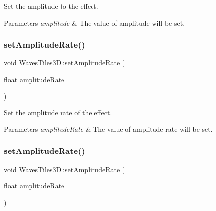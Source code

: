 Set the amplitude to the effect. 


\begin{DoxyParams}{Parameters}
{\em amplitude} & The value of amplitude will be set. \\
\hline
\end{DoxyParams}
\mbox{\label{classWavesTiles3D_a5c31881ea4cee059ce9ea49f1c8acb76}} 
\subsubsection{\texorpdfstring{set\+Amplitude\+Rate()}{setAmplitudeRate()}\hspace{0.1cm}{\footnotesize\ttfamily [1/2]}}
{\footnotesize\ttfamily void Waves\+Tiles3\+D\+::set\+Amplitude\+Rate (\begin{DoxyParamCaption}\item[{float}]{amplitude\+Rate }\end{DoxyParamCaption})\hspace{0.3cm}{\ttfamily [inline]}}



Set the amplitude rate of the effect. 


\begin{DoxyParams}{Parameters}
{\em amplitude\+Rate} & The value of amplitude rate will be set. \\
\hline
\end{DoxyParams}
\mbox{\label{classWavesTiles3D_a5c31881ea4cee059ce9ea49f1c8acb76}} 
\subsubsection{\texorpdfstring{set\+Amplitude\+Rate()}{setAmplitudeRate()}\hspace{0.1cm}{\footnotesize\ttfamily [2/2]}}
{\footnotesize\ttfamily void Waves\+Tiles3\+D\+::set\+Amplitude\+Rate (\begin{DoxyParamCaption}\item[{float}]{amplitude\+Rate }\end{DoxyParamCaption})\hspace{0.3cm}{\ttfamily [inline]}}



